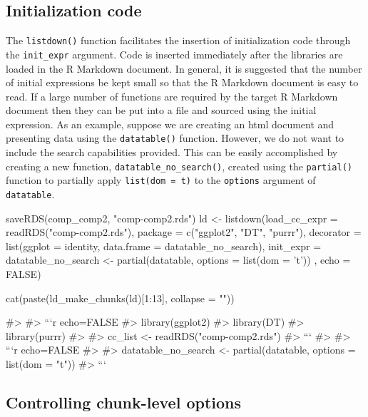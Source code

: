 \hypertarget{initialization-code}{%
\subsection{Initialization code}\label{initialization-code}}

The \texttt{listdown()} function facilitates the insertion of
initialization code through the \texttt{init\_expr} argument. Code is
inserted immediately after the libraries are loaded in the R Markdown
document. In general, it is suggested that the number of initial
expressions be kept small so that the R Markdown document is easy to
read. If a large number of functions are required by the target R
Markdown document then they can be put into a file and sourced using the
initial expression. As an example, suppose we are creating an html
document and presenting data using the \texttt{datatable()} function.
However, we do not want to include the search capabilities provided.
This can be easily accomplished by creating a new function,
\texttt{datatable\_no\_search()}, created using the \texttt{partial()}
function \cite{purrr} to partially apply
\texttt{list(dom\ =\ \textquotesingle{}t\textquotesingle{})} to the
\texttt{options} argument of \texttt{datatable}.

\begin{Schunk}
\begin{Sinput}
saveRDS(comp_comp2, "comp-comp2.rds")
ld <- listdown(load_cc_expr = readRDS("comp-comp2.rds"),
               package = c("ggplot2", "DT", "purrr"),
               decorator = list(ggplot = identity,
                                data.frame = datatable_no_search),
               init_expr = {
                 datatable_no_search <- partial(datatable,
                                                options = list(dom = 't'))
                 },
               echo = FALSE)

cat(paste(ld_make_chunks(ld)[1:13], collapse = "\n"))
\end{Sinput}
\begin{Soutput}
#> 
#> ```{r echo=FALSE}
#> library(ggplot2)
#> library(DT)
#> library(purrr)
#> 
#> cc_list <- readRDS("comp-comp2.rds")
#> ```
#> 
#> ```{r echo=FALSE}
#> 
#> datatable_no_search <- partial(datatable, options = list(dom = "t"))
#> ```
\end{Soutput}
\end{Schunk}

\hypertarget{controlling-chunk-level-options}{%
\subsection{Controlling chunk-level
options}\label{controlling-chunk-level-options}}

